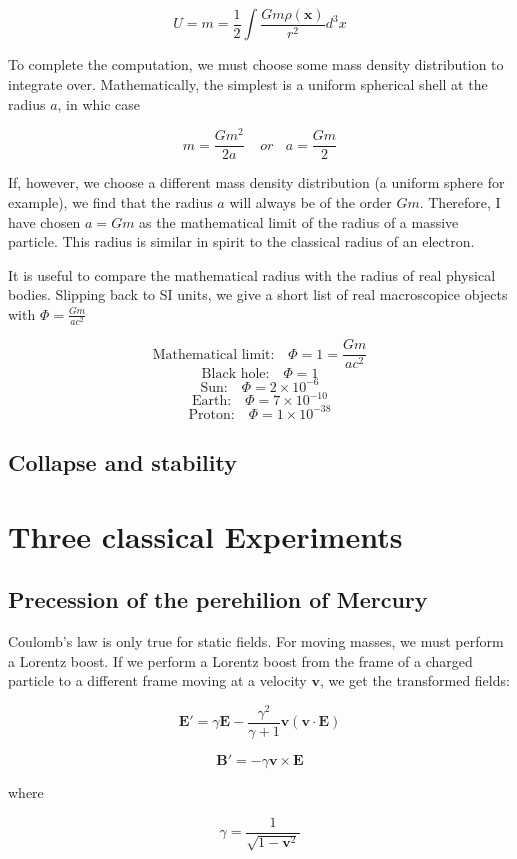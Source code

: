 \documentclass {article}
\renewcommand\vec{\mathbf}
\begin{document}
$$U = m = \frac 1 2 \int \frac {Gm \rho(\vec x)} {r^2} d^3x$$

To complete the computation, we must choose some mass density distribution to integrate over. Mathematically, the simplest is a uniform spherical shell at the radius $a$, in whic case

$$m = \frac {Gm^2} { 2a} ~~~~~ or  ~~~~ a = \frac {Gm} 2 $$

If, however, we choose a different mass density distribution (a uniform sphere for example), we find that the radius $a$ will always be of the order $Gm$. Therefore, I have chosen $a = Gm$ as the mathematical limit of the radius of a massive particle. This radius is similar in spirit to the classical radius of an electron.

It is useful to compare the mathematical radius with the radius of real physical bodies. Slipping back to SI units, we give a short list of real macroscopice objects with $\Phi = \frac {Gm}{ac^2}$

$$\text{Mathematical limit:  } ~~~ \Phi = 1 = \frac {Gm}{ac^2}$$
$$\text{Black hole:  } ~~~ \Phi = 1$$
$$\text{Sun:  } ~~~ \Phi = 2 \times 10^{-6}$$
$$\text{Earth:  } ~~~ \Phi = 7 \times 10^{-10}$$
$$\text{Proton:  } ~~~ \Phi = 1\times 10^{-38}$$

\newpage
\subsection{Collapse and stability}
\newpage


\section{Three classical Experiments}
\subsection{Precession of the perehilion of Mercury}


Coulomb's law is only true for static fields. For moving masses, we must perform a Lorentz boost. If we perform a  Lorentz boost from the frame of a charged particle to a different frame moving at a velocity $\vec v$, we get the transformed fields:

$$\vec E' = \gamma \vec E - \frac {\gamma^2} {\gamma + 1} \vec v (\vec v \cdot \vec E) $$

$$ \vec B' = - \gamma \vec v \times \vec E$$

where 

$$ \gamma = \frac 1 {\sqrt{1 - \vec v^ 2} } $$ 
\end{document}

